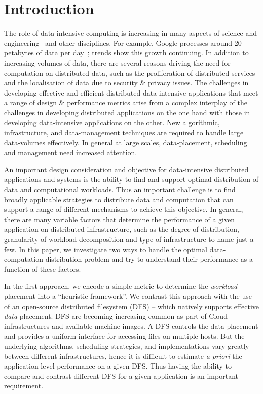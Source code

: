 \documentclass{rspublic}
\begin{document}
\vspace{-0.3cm}

\section{Introduction} 
The role of data-intensive computing is increasing in many aspects of
science and engineering~\citep{fourthparadigm} and other
disciplines. For example, Google processes around 20 petabytes of data
per day~\citep{google}; trends show this growth continuing. In
addition to increasing volumes of data, there are several reasons
driving the need for computation on distributed data, such as the
proliferation of distributed services and the localisation of data due
to security \& privacy issues. The challenges in developing effective
and efficient distributed data-intensive applications that meet a
range of design \& performance metrics arise from a complex interplay
of the challenges in developing distributed applications on the one
hand with those in developing data-intensive applications on the
other. New algorithmic, infrastructure, and data-management techniques
are required to handle large data-volumes effectively. In general at
large scales, data-placement, scheduling and management need increased
attention.

An important design consideration and objective for data-intensive
distributed applications and systems is the ability to find and
support optimal distribution of data and computational workloads. Thus
an important challenge is to find broadly applicable strategies to
distribute data and computation that can support a range of different
mechanisms to achieve this objective. In general, there are many
variable factors that determine the performance of a given application
on distributed infrastructure, such as the degree of distribution,
granularity of workload decomposition and type of infrastructure to
name just a few.  In this paper, we investigate two ways to handle the
optimal data-computation distribution problem and try to understand
their performance as a function of these factors.

In the first approach, we encode a simple metric to determine the {\it
  workload} placement into a ``heuristic framework''. We contrast this
approach with the use of an open-source distributed filesystem (DFS)
-- which natively supports effective {\it data} placement.  DFS are
becoming increasing common as part of Cloud infrastructures and
available machine images. A DFS controls the data placement and
provides a uniform interface for accessing files on multiple hosts.
But the underlying algorithms, scheduling strategies, and
implementations vary greatly between different infrastructures, hence
it is difficult to estimate {\it a priori} the application-level
performance on a given DFS.  Thus having the ability to compare and
contrast different DFS for a given application is an important
requirement.
\end{document}
